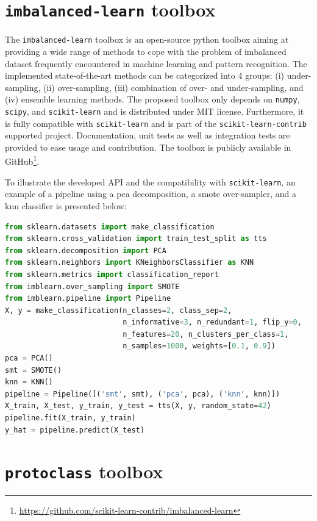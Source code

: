 \section{\texttt{imbalanced-learn} toolbox}

The \texttt{imbalanced-learn} toolbox is an open-source python toolbox aiming at providing a wide range of methods to cope with the problem of imbalanced dataset frequently encountered in machine learning and pattern recognition.
The implemented state-of-the-art methods can be categorized into 4 groups: (i) under-sampling, (ii) over-sampling, (iii) combination of over- and under-sampling, and (iv) ensemble learning methods.
The proposed toolbox only depends on \texttt{numpy}, \texttt{scipy}, and \texttt{scikit-learn} and is distributed under MIT license.
Furthermore, it is fully compatible with \texttt{scikit-learn} and is part of the \texttt{scikit-learn-contrib} supported project.
Documentation, unit tests as well as integration tests are provided to ease usage and contribution.
The toolbox is publicly available in GitHub\footnote{\url{https://github.com/scikit-learn-contrib/imbalanced-learn}}.

To illustrate the developed API and the compatibility with \texttt{scikit-learn}, an example of a pipeline using a \ac{pca} decomposition, a \ac{smote} over-sampler, and a \ac{knn} classifier is presented below:

\begin{lstlisting}[language=Python, caption=Code snippet to over-sample a dataset using \acs*{smote} in conjunction with \ac{pca} and a \ac{knn} classifer.]
from sklearn.datasets import make_classification
from sklearn.cross_validation import train_test_split as tts
from sklearn.decomposition import PCA
from sklearn.neighbors import KNeighborsClassifier as KNN
from sklearn.metrics import classification_report
from imblearn.over_sampling import SMOTE
from imblearn.pipeline import Pipeline
X, y = make_classification(n_classes=2, class_sep=2,
                           n_informative=3, n_redundant=1, flip_y=0,
                           n_features=20, n_clusters_per_class=1,
                           n_samples=1000, weights=[0.1, 0.9])
pca = PCA()
smt = SMOTE()
knn = KNN()
pipeline = Pipeline([('smt', smt), ('pca', pca), ('knn', knn)])
X_train, X_test, y_train, y_test = tts(X, y, random_state=42)
pipeline.fit(X_train, y_train)
y_hat = pipeline.predict(X_test)
\end{lstlisting}

\section{\texttt{protoclass} toolbox}


